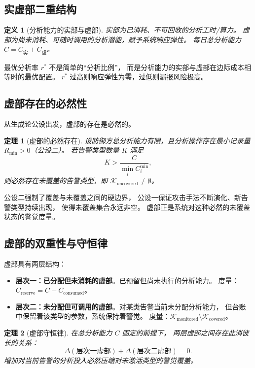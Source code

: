 \documentclass[11pt,a4paper]{article}
\newtheorem{definition}{定义}[section]
\newtheorem{theorem}{定理}[section]
\begin{document}
\subsection{实虚部二重结构}

\begin{definition}[分析能力的实部与虚部]
实部为已消耗、不可回收的分析工时/算力。
虚部为尚未消耗、可随时调用的分析潜能，赋予系统响应弹性。
每日总分析能力 $C = C_{\text{实}} + C_{\text{虚}}$。
\end{definition}

最优分析率 $r^*$ 不是简单的“分析比例”，
而是分析能力的实部与虚部在边际成本相等时的最优配置。
$r^*$ 过高则响应弹性为零，过低则漏报风险极高。

\subsection{虚部存在的必然性}

从生成论公设出发，虚部的存在是必然的。

\begin{theorem}[虚部的必然存在]\label{thm:necessity}
设防御方总分析能力有限，且分析操作存在最小记录量 $R_{\min} > 0$（公设二）。
若告警类型数量 $K$ 满足
\[
K > \frac{C}{\min_i C_i^{\min}},
\]
则必然存在未覆盖的告警类型，即 $\mathcal{K}_{\text{uncovered}} \neq \emptyset$。
\end{theorem}

公设二强制了覆盖与未覆盖之间的硬边界，
公设一保证攻击手法不断演化、新告警类型持续出现，
使得未覆盖集合永远非空。
虚部正是系统对这种必然的未覆盖状态的警觉度量。

\subsection{虚部的双重性与守恒律}

虚部具有两层结构：
\begin{itemize}
    \item \textbf{层次一：已分配但未消耗的虚部}。已预留但尚未执行的分析能力。
          度量：$C_{\text{reserve}} = C - C_{\text{consumed}}$。
    \item \textbf{层次二：未分配但可调用的虚部}。对某类告警当前未分配分析能力，
          但台账中保留着该类型的参数，系统保持着警觉。
          度量：$\mathcal{K}_{\text{monitored}} \setminus \mathcal{K}_{\text{covered}}$。
\end{itemize}

\begin{theorem}[虚部守恒律]\label{thm:conservation}
在总分析能力 $C$ 固定的前提下，
两层虚部之间存在此消彼长的关系：
\[
\Delta(\text{层次一虚部}) + \Delta(\text{层次二虚部}) = 0.
\]
增加对当前告警的分析投入必然压缩对未激活类型的警觉覆盖。
\end{theorem}
\end{document}
